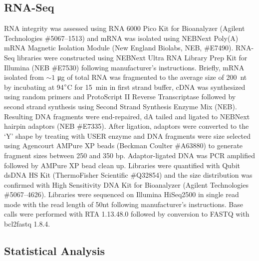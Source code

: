 \documentclass[9pt,twocolumn,twoside]{gsag3jnl}
\begin{document}
\subsection*{RNA-Seq}
\label{sb:rna_seq}
RNA integrity was assessed using RNA 6000 Pico Kit for Bioanalyzer (Agilent
Technologies \#5067--1513) and mRNA was isolated using NEBNext Poly(A) mRNA
Magnetic Isolation Module (New England Biolabs, NEB, \#E7490). RNA-Seq libraries
were constructed using NEBNext Ultra RNA Library Prep Kit for Illumina (NEB
\#E7530) following manufacturer’s instructions. Briefly, mRNA isolated from
$\sim1$ \si{\micro\gram} of total RNA was fragmented to the average size of
200~nt by incubating at 94$\degree$C for 15~min in first strand buffer, cDNA was
synthesized using random primers and ProtoScript II Reverse Transcriptase
followed by second strand synthesis using Second Strand Synthesis Enzyme Mix
(NEB). Resulting DNA fragments were end-repaired, dA tailed and ligated to
NEBNext hairpin adaptors (NEB \#E7335). After ligation, adaptors were converted
to the ‘Y’ shape by treating with USER enzyme and DNA fragments were size
selected using Agencourt AMPure XP beads (Beckman Coulter \#A63880) to generate
fragment sizes between 250 and 350 bp. Adaptor-ligated DNA was PCR amplified
followed by AMPure XP bead clean up. Libraries were quantified with Qubit dsDNA
HS Kit (ThermoFisher Scientific \#Q32854) and the size distribution was
confirmed with High Sensitivity DNA Kit for Bioanalyzer (Agilent Technologies
\#5067--4626). Libraries were sequenced on Illumina HiSeq2500 in single read
mode with the read length of 50nt following manufacturer's instructions. Base
calls were performed with RTA 1.13.48.0 followed by conversion to FASTQ with
bcl2fastq 1.8.4.

\subsection*{Statistical Analysis}
\label{sb:statistics}
\end{document}

